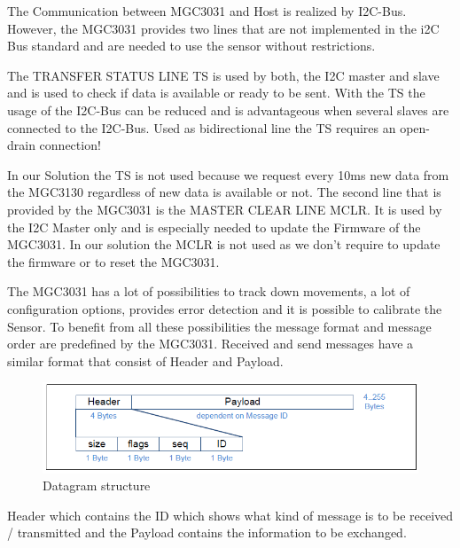 \documentclass{article}
\begin{document}
\noindent The Communication between MGC3031 and Host is realized by I2C-Bus. However, the MGC3031 provides two lines that are not implemented in the i2C Bus standard and are needed to use the sensor without restrictions.

\medskip

\noindent The TRANSFER STATUS LINE TS is used by both, the I2C master and slave and is used to check if data is available or ready to be sent. With the TS the usage of the I2C-Bus can be reduced and is advantageous when several slaves are connected to the I2C-Bus. Used as bidirectional line the TS requires an open-drain connection!

\medskip

\noindent In our Solution the TS is not used because we request every 10ms new data from the MGC3130 regardless of new data is available or not.
The second line that is provided by the MGC3031 is the MASTER CLEAR LINE MCLR. It is used by the I2C Master only and is especially needed to update the Firmware of the MGC3031. In our solution the MCLR is not used as we don’t require to update the firmware or to reset the MGC3031.

\medskip

\noindent The MGC3031 has a lot of possibilities to track down movements, a lot of configuration options, provides error detection and it is possible to calibrate the Sensor.
To benefit from all these possibilities the message format and message order are predefined by the MGC3031. Received and send messages have a similar format that consist of Header and Payload.

\medskip

\begin{figure}[h]
\centering
\includegraphics[width=15cm]{Figure1.PNG}
\caption{Datagram structure}
\end{figure}

\medskip

\noindent Header which contains the ID which shows what kind of message is to be received / transmitted and the Payload contains the information to be exchanged. 

\medskip
\end{document}
